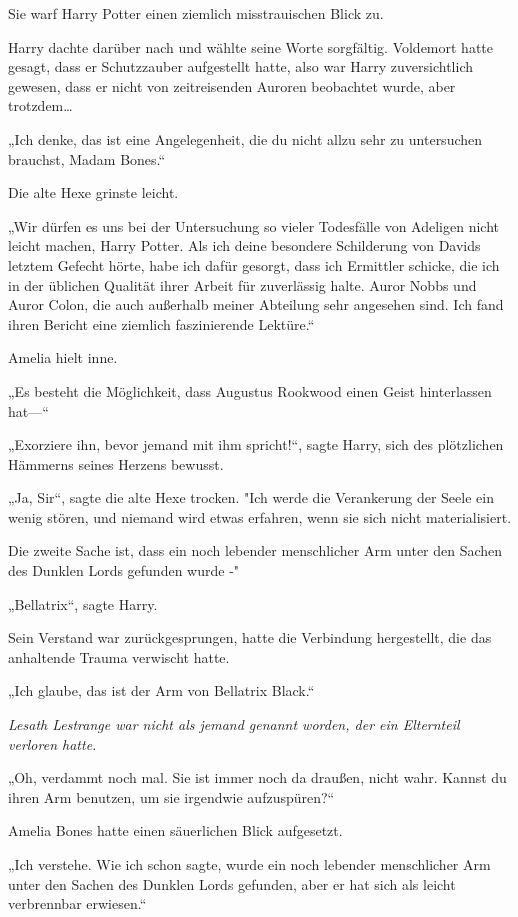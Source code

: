 {Sie warf Harry Potter einen ziemlich misstrauischen Blick zu.

Harry dachte darüber nach und wählte seine Worte sorgfältig. Voldemort hatte gesagt, dass er Schutzzauber aufgestellt hatte, also war Harry zuversichtlich gewesen, dass er nicht von zeitreisenden Auroren beobachtet wurde, aber trotzdem…

„Ich denke, das ist eine Angelegenheit, die du nicht allzu sehr zu untersuchen brauchst, Madam Bones.“

Die alte Hexe grinste leicht.

„Wir dürfen es uns bei der Untersuchung so vieler Todesfälle von Adeligen nicht leicht machen, Harry Potter. Als ich deine besondere Schilderung von Davids letztem Gefecht hörte, habe ich dafür gesorgt, dass ich Ermittler schicke, die ich in der üblichen Qualität ihrer Arbeit für zuverlässig halte. Auror Nobbs und Auror Colon, die auch außerhalb meiner Abteilung sehr angesehen sind. Ich fand ihren Bericht eine ziemlich faszinierende Lektüre.“

Amelia hielt inne.

„Es besteht die Möglichkeit, dass Augustus Rookwood einen Geist hinterlassen hat—“

„Exorziere ihn, bevor jemand mit ihm spricht!“, sagte Harry, sich des plötzlichen Hämmerns seines Herzens bewusst.

„Ja, Sir“, sagte die alte Hexe trocken. "Ich werde die Verankerung der Seele ein wenig stören, und niemand wird etwas erfahren, wenn sie sich nicht materialisiert.

Die zweite Sache ist, dass ein noch lebender menschlicher Arm unter den Sachen des Dunklen Lords gefunden wurde -"

„Bellatrix“, sagte Harry.

Sein Verstand war zurückgesprungen, hatte die Verbindung hergestellt, die das anhaltende Trauma verwischt hatte.

„Ich glaube, das ist der Arm von Bellatrix Black.“

\emph{Lesath Lestrange war nicht als jemand genannt worden, der ein Elternteil verloren hatte.}

„Oh, verdammt noch mal. Sie ist immer noch da draußen, nicht wahr. Kannst du ihren Arm benutzen, um sie irgendwie aufzuspüren?“

Amelia Bones hatte einen säuerlichen Blick aufgesetzt.

„Ich verstehe. Wie ich schon sagte, wurde ein noch lebender menschlicher Arm unter den Sachen des Dunklen Lords gefunden, aber er hat sich als leicht verbrennbar erwiesen.“

}
